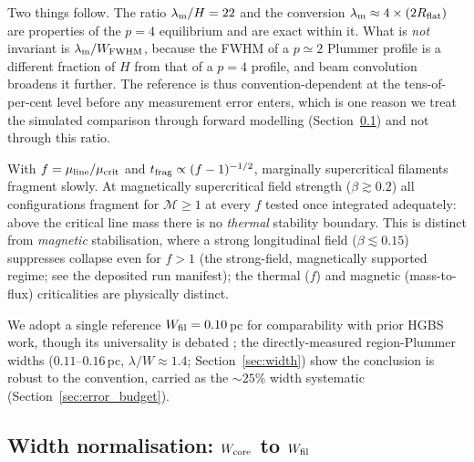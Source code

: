 \documentclass[usenatbib,twoside,twocolumn]{mnras}
\begin{document}
Two things follow. The ratio $\lambda_{\rm m}/H=22$ and the conversion $\lambda_{\rm m}\approx4\times(2R_{\rm flat})$ are properties of the $p=4$ equilibrium and are exact within it. What is \emph{not} invariant is $\lambda_{\rm m}/W_{\rm FWHM}$, because the FWHM of a $p\simeq2$ Plummer profile is a different fraction of $H$ from that of a $p=4$ profile, and beam convolution broadens it further. The reference is thus convention-dependent at the tens-of-per-cent level before any measurement error enters, which is one reason we treat the simulated comparison through forward modelling (Section~\ref{sec:width_correction}) and not through this ratio.

With $f=\mu_{\rm line}/\mu_{\rm crit}$ and $t_{\rm frag}\propto(f-1)^{-1/2}$, marginally supercritical filaments fragment slowly. At magnetically supercritical field strength ($\beta\gtrsim0.2$) all configurations fragment for $\mathcal{M}\geq1$ at every $f$ tested once integrated adequately: above the critical line mass there is no \emph{thermal} stability boundary. This is distinct from \emph{magnetic} stabilisation, where a strong longitudinal field ($\beta\lesssim0.15$) suppresses collapse even for $f>1$ (the strong-field, magnetically supported regime; see the deposited run manifest); the thermal ($f$) and magnetic (mass-to-flux) criticalities are physically distinct.

We adopt a single reference $W_{\rm fil}=0.10$\,pc for comparability with prior HGBS work, though its universality is debated \citep{Panopoulou2017,Panopoulou2022}; the directly-measured region-Plummer widths ($0.11$--$0.16$\,pc, $\lambda/W\approx1.4$; Section~\ref{sec:width}) show the conclusion is robust to the convention, carried as the $\sim25\%$ width systematic (Section~\ref{sec:error_budget}).

\subsection{Width normalisation: $W_{\rm core}$ to $W_{\rm fil}$}
\label{sec:width_correction}
\end{document}
